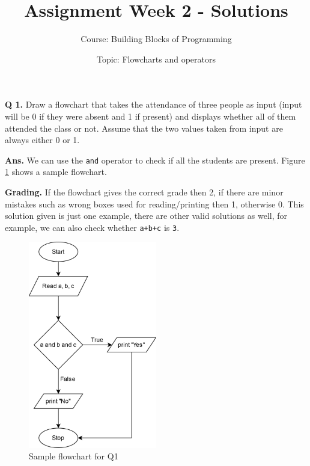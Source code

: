 \documentclass{article}
\title{Assignment Week 2 - Solutions}
\author{Course: Building Blocks of Programming}
\date{Topic: Flowcharts and operators}
\begin{document}
\maketitle

\begin{flushleft}

\textbf{Q 1. } Draw a flowchart that takes the attendance of three people as input 
(input will be 0 if they were absent and 1 if present) and displays whether all of 
them attended the class or not. Assume that the two values taken from input are 
always either 0 or 1.

\end{flushleft}

\begin{flushleft}

\textbf{Ans. } We can use the \lstinline{and} operator to check if all the students 
are present. Figure \ref{Q1} shows a sample flowchart.

\end{flushleft}

\begin{flushleft}

\textbf{Grading. } If the flowchart gives the correct grade then 2, if there are 
minor mistakes such as wrong boxes used for reading/printing then 1, otherwise 0.
This solution given is just one example, there are other valid solutions as well,
for example, we can also check whether \lstinline{a+b+c} is \lstinline{3}.

\end{flushleft}

\begin{figure}[ht]
    \centering
    \includegraphics[width=0.5\textwidth]{Q1.png}
    \caption{Sample flowchart for Q1}
    \label{Q1}
\end{figure}
\end{document}
